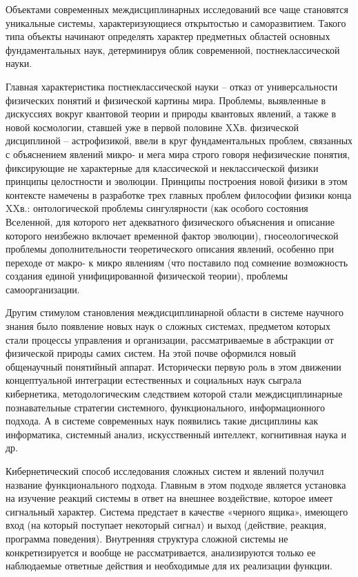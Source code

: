 \documentclass[exam_answers.tex]{subfiles}
\begin{document}
\renewcommand{\baselinestretch}{\blch}

Объектами современных междисциплинарных исследований все чаще
становятся уникальные системы, характеризующиеся открытостью и
саморазвитием. Такого типа объекты начинают определять характер
предметных областей основных фундаментальных наук, детерминируя
облик современной, постнеклассической науки.

Главная характеристика постнеклассической науки – отказ от
универсальности физических понятий и физической картины мира. Проблемы,
выявленные в дискуссиях вокруг квантовой теории и природы квантовых
явлений, а также в новой космологии, ставшей уже в первой половине XXв.
физической дисциплиной – астрофизикой, ввели в круг фундаментальных
проблем, связанных с объяснением явлений микро- и мега мира строго говоря
нефизические понятия, фиксирующие не характерные для классической и
неклассической физики принципы целостности и эволюции. Принципы
построения новой физики в этом контексте намечены в разработке трех
главных проблем философии физики конца XXв.: онтологической проблемы
сингулярности (как особого состояния Вселенной, для которого нет
адекватного физического объяснения и описание которого неизбежно включает
временной фактор эволюции), гносеологической проблемы дополнительности
теоретического описания явлений, особенно при переходе от макро- к микро
явлениям (что поставило под сомнение возможность создания единой
унифицированной физической теории), проблемы самоорганизации.

Другим стимулом становления междисциплинарной области в системе
научного знания было появление новых наук о сложных системах, предметом
которых стали процессы управления и организации, рассматриваемые в
абстракции от физической природы самих систем. На этой почве оформился
новый общенаучный понятийный аппарат. Исторически первую роль в этом
движении концептуальной интеграции естественных и социальных наук
сыграла кибернетика, методологическим следствием которой стали
междисциплинарные познавательные стратегии системного,
функционального, информационного подхода. А в системе современных наук
появились такие дисциплины как информатика, системный анализ,
искусственный интеллект, когнитивная наука и др.

Кибернетический способ исследования сложных систем и явлений
получил название функционального подхода. Главным в этом подходе является
установка на изучение реакций системы в ответ на внешнее воздействие, 
которое имеет сигнальный характер. Система предстает в качестве «черного
ящика», имеющего вход (на который поступает некоторый сигнал) и выход
(действие, реакция, программа поведения). Внутренняя структура сложной
системы не конкретизируется и вообще не рассматривается, анализируются
только ее наблюдаемые ответные действия и необходимые для их реализации
функции.
\end{document}
